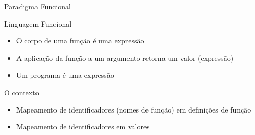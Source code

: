 \begin{frame}{Paradigma Funcional}
	\begin{block}{Linguagem Funcional}
		\begin{itemize}
			\item O corpo de uma função é uma expressão
			\item A aplicação da função a um argumento retorna um valor (expressão)
			\item Um programa é uma expressão
		\end{itemize}		
	\end{block}
	\begin{block}{O contexto}
		\begin{itemize}
			\item Mapeamento de identificadores (nomes de função) em definições de função
			\item Mapeamento de identificadores em valores  
		\end{itemize}
	\end{block}
\end{frame}